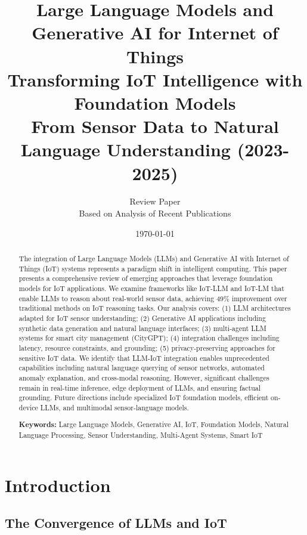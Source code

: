 \documentclass[12pt,a4paper]{article}
\title{
\vspace{-1cm}
{\Huge\bfseries Large Language Models and Generative AI for Internet of Things}\\[0.5cm]
{\Large Transforming IoT Intelligence with Foundation Models}\\[0.3cm]
{\large From Sensor Data to Natural Language Understanding (2023-2025)}
}
\author{
\large Review Paper\\[0.2cm]
\normalsize Based on Analysis of Recent Publications
}
\date{\today}
\begin{document}
\maketitle
\thispagestyle{empty}

\begin{abstract}
\noindent
The integration of Large Language Models (LLMs) and Generative AI with Internet of Things (IoT) systems represents a paradigm shift in intelligent computing. This paper presents a comprehensive review of emerging approaches that leverage foundation models for IoT applications. We examine frameworks like IoT-LLM and IoT-LM that enable LLMs to reason about real-world sensor data, achieving 49\% improvement over traditional methods on IoT reasoning tasks. Our analysis covers: (1) LLM architectures adapted for IoT sensor understanding; (2) Generative AI applications including synthetic data generation and natural language interfaces; (3) multi-agent LLM systems for smart city management (CityGPT); (4) integration challenges including latency, resource constraints, and grounding; (5) privacy-preserving approaches for sensitive IoT data. We identify that LLM-IoT integration enables unprecedented capabilities including natural language querying of sensor networks, automated anomaly explanation, and cross-modal reasoning. However, significant challenges remain in real-time inference, edge deployment of LLMs, and ensuring factual grounding. Future directions include specialized IoT foundation models, efficient on-device LLMs, and multimodal sensor-language models.

\vspace{0.3cm}
\noindent\textbf{Keywords:} Large Language Models, Generative AI, IoT, Foundation Models, Natural Language Processing, Sensor Understanding, Multi-Agent Systems, Smart IoT
\end{abstract}

\newpage
\tableofcontents
\newpage

\section{Introduction}

\subsection{The Convergence of LLMs and IoT}
\end{document}
